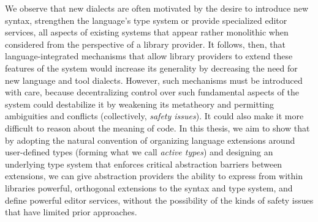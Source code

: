We observe that new dialects are often motivated by the desire to introduce new syntax, strengthen the language's type system or provide specialized editor services, all aspects of existing systems that appear rather monolithic when considered from the perspective of a library provider. %
It follows, then, that {language-integrated mechanisms} that allow library providers to extend these features of the system would increase its generality by decreasing the need for new language and tool dialects. However, such mechanisms must be introduced with care, because decentralizing control over such fundamental aspects of the system could destabilize it by weakening its metatheory and permitting ambiguities and conflicts (collectively, \emph{safety issues}). It could also make it more difficult to reason about the meaning of code. 
In this thesis, we aim to show that by adopting the natural convention of organizing language extensions around user-defined types (forming what we call \emph{active types}) and designing an underlying type system that enforces critical  abstraction barriers between extensions, we can give abstraction providers the ability to express from within libraries powerful, orthogonal extensions to the syntax and type system, and define powerful editor services, without the possibility of the kinds of safety issues that have limited prior approaches. %

